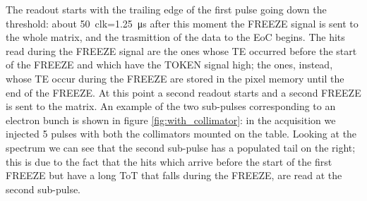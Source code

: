    The readout starts with the trailing edge of the first pulse going down the threshold: about \SI{50}{clk}=\SI{1.25}{\us} after this moment the FREEZE signal is sent to the whole matrix, and the trasmittion of the data to the EoC begins.
   The hits read during the FREEZE signal are the ones whose TE occurred before the start of the FREEZE and which have the TOKEN signal high; the ones, instead, whose TE occur during the FREEZE are stored in the pixel memory until the end of the FREEZE. At this point a second readout starts and a second FREEZE is sent to the matrix.  
   An example of the two sub-pulses corresponding to an electron bunch is shown in figure \ref{fig:with_collimator}: in the acquisition we injected 5 pulses with both the collimators mounted on the table. 
   Looking at the spectrum we can see that the second sub-pulse has a populated tail on the right; this is due to the fact that the hits which arrive before the start of the first FREEZE but have a long ToT that falls during the FREEZE, are read at the second sub-pulse. 
   
